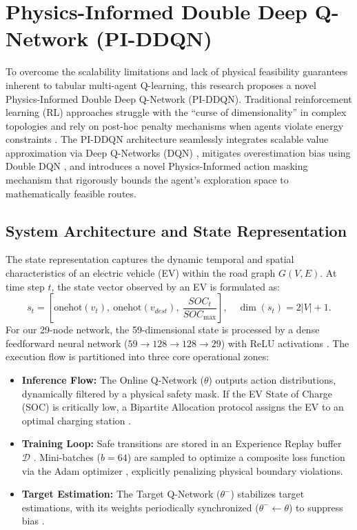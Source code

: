 \documentclass{article}
\begin{document}
\section{Physics-Informed Double Deep Q-Network (PI-DDQN)}
\label{sec:pi_ddqn}

To overcome the scalability limitations and lack of physical feasibility guarantees inherent to tabular multi-agent Q-learning, this research proposes a novel Physics-Informed Double Deep Q-Network (PI-DDQN). Traditional reinforcement learning (RL) approaches struggle with the ``curse of dimensionality'' in complex topologies and rely on post-hoc penalty mechanisms when agents violate energy constraints \cite{sutton2018rl, mnih2015dqn}. The PI-DDQN architecture seamlessly integrates scalable value approximation via Deep Q-Networks (DQN) \cite{mnih2015dqn}, mitigates overestimation bias using Double DQN \cite{van2016deep, thrun1993issues}, and introduces a novel Physics-Informed action masking mechanism that rigorously bounds the agent's exploration space to mathematically feasible routes.

\subsection{System Architecture and State Representation}
The state representation captures the dynamic temporal and spatial characteristics of an electric vehicle (EV) within the road graph $G(V,E)$. At time step $t$, the state vector observed by an EV is formulated as:
\begin{equation}
s_t = \left[\text{onehot}(v_t),\ \text{onehot}(v_{dest}),\ \frac{SOC_t}{SOC_{\max}}\right], \quad \dim(s_t) = 2|V| + 1.
\end{equation}
For our 29-node network, the 59-dimensional state is processed by a dense feedforward neural network ($59 \rightarrow 128 \rightarrow 128 \rightarrow 29$) with ReLU activations \cite{goodfellow2016deep}. The execution flow is partitioned into three core operational zones:
\begin{itemize}
    \item \textbf{Inference Flow:} The Online Q-Network ($\theta$) outputs action distributions, dynamically filtered by a physical safety mask. If the EV State of Charge (SOC) is critically low, a Bipartite Allocation protocol assigns the EV to an optimal charging station \cite{kuhn1955hungarian}.
    \item \textbf{Training Loop:} Safe transitions are stored in an Experience Replay buffer $\mathcal{D}$ \cite{lin1992self}. Mini-batches ($b=64$) are sampled to optimize a composite loss function via the Adam optimizer \cite{kingma2014adam}, explicitly penalizing physical boundary violations.
    \item \textbf{Target Estimation:} The Target Q-Network ($\theta^-$) stabilizes target estimations, with its weights periodically synchronized ($\theta^- \leftarrow \theta$) to suppress bias \cite{van2016deep}.
\end{itemize}
\end{document}
